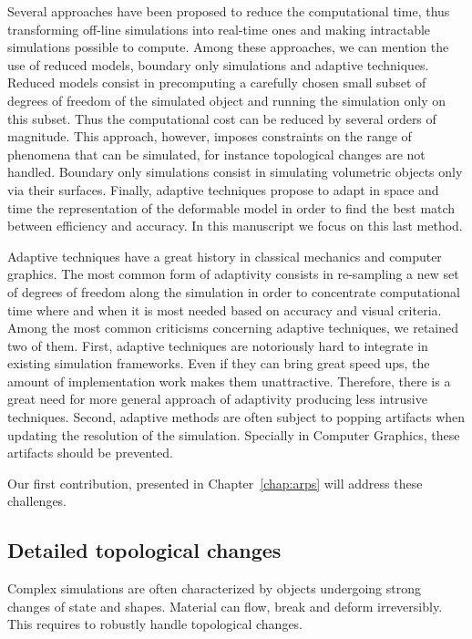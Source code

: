 Several approaches have been proposed to reduce the computational time, thus transforming off-line simulations into real-time ones and making intractable simulations possible to compute. 
Among these approaches, we can mention the use of reduced models, boundary only simulations and adaptive techniques. 
Reduced models consist in precomputing a carefully chosen small subset of degrees of freedom of the simulated object and running the simulation only on this subset. 
Thus the computational cost can be reduced by several orders of magnitude. 
This approach, however, imposes constraints on the range of phenomena that can be simulated, for instance topological changes are not handled. 
Boundary only simulations consist in simulating volumetric objects only via their surfaces. 
Finally, adaptive techniques propose to adapt in space and time the representation of the deformable model in order to find the best match between efficiency and accuracy. In this manuscript we focus on this last method. 

Adaptive techniques have a great history in classical mechanics and computer graphics. The most common form of adaptivity consists in re-sampling a new set of degrees of freedom along the simulation in order to concentrate computational time where and when it is most needed based on accuracy and visual criteria. Among the most common criticisms concerning adaptive techniques, we retained two of them. First, adaptive techniques are notoriously hard to integrate in existing simulation frameworks. Even if they can bring great speed ups, the amount of implementation work makes them unattractive. Therefore, there is a great need for more general approach of adaptivity producing less intrusive techniques. Second, adaptive methods are often subject to popping artifacts when updating the resolution of the simulation. Specially in Computer Graphics, these artifacts should be prevented.

Our first contribution, presented in Chapter~\ref{chap:arps} will address these challenges.

\subsection{Detailed topological changes}

Complex simulations are often characterized by objects undergoing strong changes of state and shapes. Material can flow, break and deform irreversibly. This requires to robustly handle topological changes.

